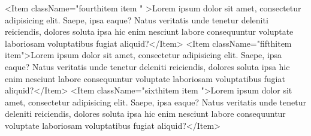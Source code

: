       <Item className="fourthitem  item " >Lorem ipsum dolor sit amet, consectetur adipisicing elit. Saepe, ipsa eaque? Natus veritatis unde tenetur deleniti reiciendis, dolores soluta ipsa hic enim nesciunt labore consequuntur voluptate laboriosam voluptatibus fugiat aliquid?</Item>
      <Item className="fifthitem   item">Lorem ipsum dolor sit amet, consectetur adipisicing elit. Saepe, ipsa eaque? Natus veritatis unde tenetur deleniti reiciendis, dolores soluta ipsa hic enim nesciunt labore consequuntur voluptate laboriosam voluptatibus fugiat aliquid?</Item>
      <Item className="sixthitem   item ">Lorem ipsum dolor sit amet, consectetur adipisicing elit. Saepe, ipsa eaque? Natus veritatis unde tenetur deleniti reiciendis, dolores soluta ipsa hic enim nesciunt labore consequuntur voluptate laboriosam voluptatibus fugiat aliquid?</Item>
